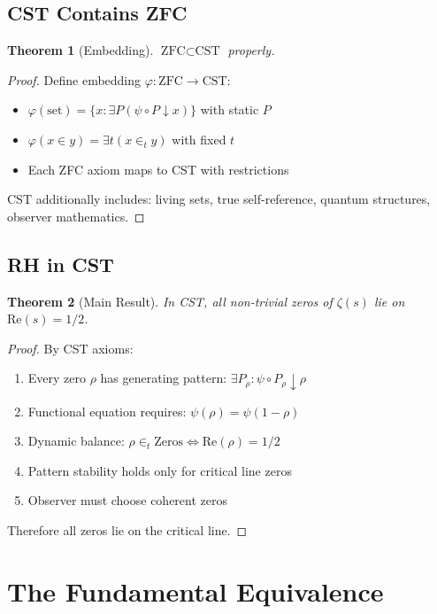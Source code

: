 \documentclass[12pt]{article}
\newtheorem{theorem}{Theorem}[section]
\newcommand{\CST}{\text{CST}}
\newcommand{\ZFC}{\text{ZFC}}
\begin{document}
\subsection{CST Contains ZFC}

\begin{theorem}[Embedding]
$\ZFC \subset \CST$ properly.
\end{theorem}

\begin{proof}
Define embedding $\varphi: \ZFC \to \CST$:
\begin{itemize}
\item $\varphi(\text{set}) = \{x : \exists P (\psi \circ P \downarrow x)\}$ with static $P$
\item $\varphi(x \in y) = \exists t (x \in_t y)$ with fixed $t$
\item Each ZFC axiom maps to CST with restrictions
\end{itemize}
CST additionally includes: living sets, true self-reference, quantum structures, observer mathematics.
\end{proof}

\subsection{RH in CST}

\begin{theorem}[Main Result]
In CST, all non-trivial zeros of $\zeta(s)$ lie on $\text{Re}(s) = 1/2$.
\end{theorem}

\begin{proof}
By CST axioms:
\begin{enumerate}
\item Every zero $\rho$ has generating pattern: $\exists P_\rho : \psi \circ P_\rho \downarrow \rho$
\item Functional equation requires: $\psi(\rho) = \psi(1-\rho)$
\item Dynamic balance: $\rho \in_t \text{Zeros} \Leftrightarrow \text{Re}(\rho) = 1/2$
\item Pattern stability holds only for critical line zeros
\item Observer must choose coherent zeros
\end{enumerate}
Therefore all zeros lie on the critical line.
\end{proof}

\section{The Fundamental Equivalence}
\end{document}
